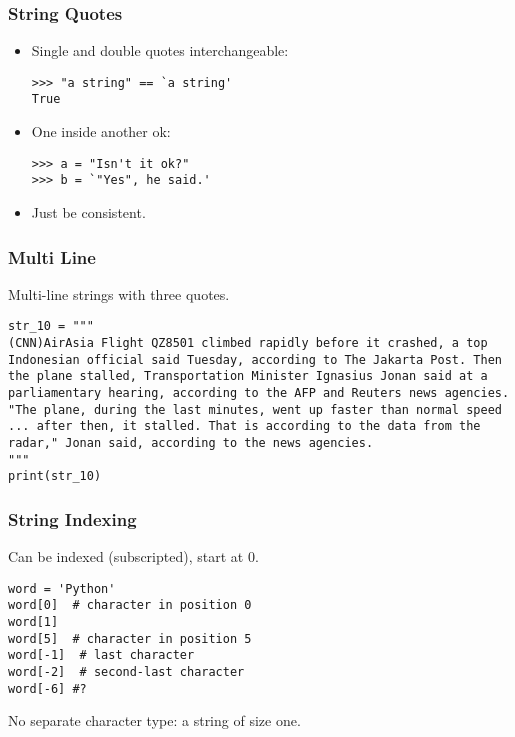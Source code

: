 


\begin{frame}[fragile]\frametitle{String Quotes}
\begin{itemize}
\item  Single and double quotes interchangeable:
\begin{lstlisting}
>>> "a string" == `a string'
True
\end{lstlisting}
\item One inside another ok:
\begin{lstlisting}
>>> a = "Isn't it ok?"
>>> b = `"Yes", he said.'
\end{lstlisting}
\item Just be consistent.
\end{itemize}
\end{frame}

\begin{frame}[fragile] \frametitle{Multi Line}
Multi-line strings with three quotes.
\begin{lstlisting}[showstringspaces=false]
str_10 = """
(CNN)AirAsia Flight QZ8501 climbed rapidly before it crashed, a top Indonesian official said Tuesday, according to The Jakarta Post. Then the plane stalled, Transportation Minister Ignasius Jonan said at a parliamentary hearing, according to the AFP and Reuters news agencies. "The plane, during the last minutes, went up faster than normal speed ... after then, it stalled. That is according to the data from the radar," Jonan said, according to the news agencies.
"""
print(str_10)
\end{lstlisting}
\end{frame}

\begin{frame}[fragile]\frametitle{String Indexing}
Can be indexed (subscripted), start at 0.
\begin{lstlisting}
word = 'Python'
word[0]  # character in position 0
word[1]
word[5]  # character in position 5
word[-1]  # last character
word[-2]  # second-last character
word[-6] #?
\end{lstlisting}
No separate character type:  a string of size one.
\end{frame}

